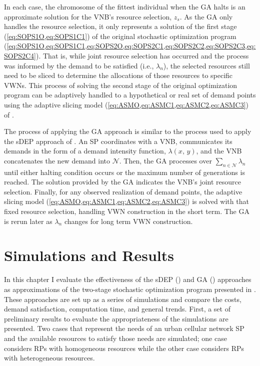 \documentclass[12pt,dvipsnames]{report}
\begin{document}
In each case, the chromosome of the fittest individual when the GA halts is an approximate solution for the VNB's resource selection, $z_s$.  As the GA only handles the resource selection, it only represents a solution of the first stage (\cref{eq:SOPS1O,eq:SOPS1C1}) of the original stochastic optimization program (\cref{eq:SOPS1O,eq:SOPS1C1,eq:SOPS2O,eq:SOPS2C1,eq:SOPS2C2,eq:SOPS2C3,eq:SOPS2C4}).  That is, while joint resource selection has occurred and the process was informed by the demand to be satisfied (i.e., $\lambda_n$), the selected resources still need to be sliced to determine the allocations of those resources to specific VWNs.  This process of solving the second stage of the original optimization program can be adaptively handled to a hypothetical or real set of demand points using the adaptive slicing model (\cref{eq:ASMO,eq:ASMC1,eq:ASMC2,eq:ASMC3}) of .

The process of applying the GA approach is similar to the process used to apply the sDEP approach of .  An SP coordinates with a VNB, communicates its demands in the form of a demand intensity function, $\lambda \left( x,\, y \right)$, and the VNB concatenates the new demand into $\mathcal{N}$.  Then, the GA processes over $\sum_{n \in \mathcal{N}} \lambda_n$ until either halting condition occurs or the maximum number of generations is reached.  The solution provided by the GA indicates the VNB's joint resource selection.  Finally, for any observed realization of demand points, the adaptive slicing model (\cref{eq:ASMO,eq:ASMC1,eq:ASMC2,eq:ASMC3}) is solved with that fixed resource selection, handling VWN construction in the short term.  The GA is rerun later as $\lambda_n$ changes for long term VWN construction.

\pagebreak
\chapter{Simulations and Results} \label{ch:sim}

In this chapter I evaluate the effectiveness of the sDEP () and GA () approaches as approximations of the two-stage stochastic optimization program presented in .  These approaches are set up as a series of simulations and compare the costs, demand satisfaction, computation time, and general trends.  First, a set of preliminary results to evaluate the appropriateness of the simulations are presented.  Two cases that represent the needs of an urban cellular network SP and the available resources to satisfy those needs are simulated; one case considers RPs with homogeneous resources while the other case considers RPs with heterogeneous resources.
\end{document}
